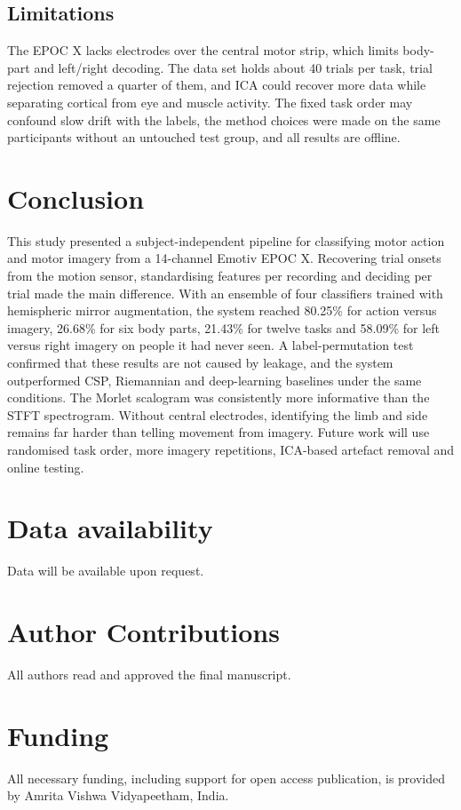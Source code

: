 \documentclass[pdflatex,sn-mathphys-num]{sn-jnl}%
\theoremstyle{thmstyleone}%
\theoremstyle{thmstyletwo}%
\theoremstyle{thmstylethree}%
\begin{document}
\subsection{Limitations}
The EPOC X lacks electrodes over the central motor strip, which limits body-part and left/right decoding. The data set holds about 40 trials per task, trial rejection removed a quarter of them, and ICA could recover more data while separating cortical from eye and muscle activity. The fixed task order may confound slow drift with the labels, the method choices were made on the same participants without an untouched test group, and all results are offline.

\section{Conclusion}\label{sec:conclusion}

This study presented a subject-independent pipeline for classifying motor action and motor imagery from a 14-channel Emotiv EPOC X. Recovering trial onsets from the motion sensor, standardising features per recording and deciding per trial made the main difference. With an ensemble of four classifiers trained with hemispheric mirror augmentation, the system reached 80.25\% for action versus imagery, 26.68\% for six body parts, 21.43\% for twelve tasks and 58.09\% for left versus right imagery on people it had never seen. A label-permutation test confirmed that these results are not caused by leakage, and the system outperformed CSP, Riemannian and deep-learning baselines under the same conditions. The Morlet scalogram was consistently more informative than the STFT spectrogram. Without central electrodes, identifying the limb and side remains far harder than telling movement from imagery. Future work will use randomised task order, more imagery repetitions, ICA-based artefact removal and online testing.

\section{Data availability}
Data will be available upon request.

\section{Author Contributions}
All authors read and approved the final manuscript.

\section{Funding}
All necessary funding, including support for open access publication, is provided by Amrita Vishwa Vidyapeetham, India.


\end{document}
